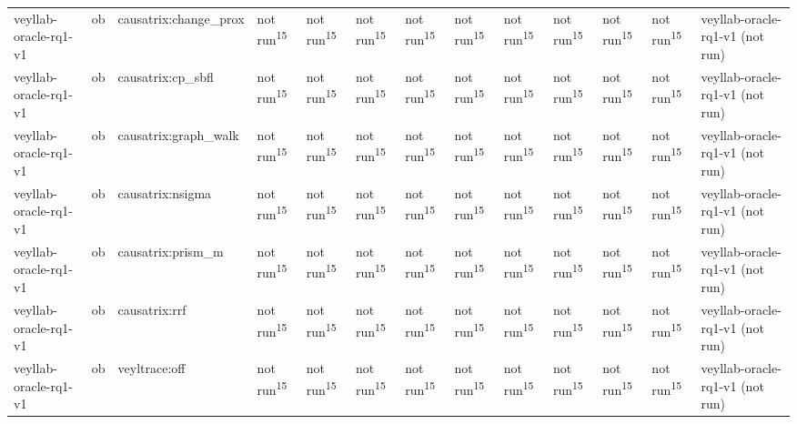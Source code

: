 \begin{table}[t]
\begin{tabular}{lllllllllllll}
veyllab-oracle-rq1-v1 & ob & causatrix:change\_prox & not run\textsuperscript{15} & not run\textsuperscript{15} & not run\textsuperscript{15} & not run\textsuperscript{15} & not run\textsuperscript{15} & not run\textsuperscript{15} & not run\textsuperscript{15} & not run\textsuperscript{15} & not run\textsuperscript{15} & veyllab-oracle-rq1-v1 (not run) \\
veyllab-oracle-rq1-v1 & ob & causatrix:cp\_sbfl & not run\textsuperscript{15} & not run\textsuperscript{15} & not run\textsuperscript{15} & not run\textsuperscript{15} & not run\textsuperscript{15} & not run\textsuperscript{15} & not run\textsuperscript{15} & not run\textsuperscript{15} & not run\textsuperscript{15} & veyllab-oracle-rq1-v1 (not run) \\
veyllab-oracle-rq1-v1 & ob & causatrix:graph\_walk & not run\textsuperscript{15} & not run\textsuperscript{15} & not run\textsuperscript{15} & not run\textsuperscript{15} & not run\textsuperscript{15} & not run\textsuperscript{15} & not run\textsuperscript{15} & not run\textsuperscript{15} & not run\textsuperscript{15} & veyllab-oracle-rq1-v1 (not run) \\
veyllab-oracle-rq1-v1 & ob & causatrix:nsigma & not run\textsuperscript{15} & not run\textsuperscript{15} & not run\textsuperscript{15} & not run\textsuperscript{15} & not run\textsuperscript{15} & not run\textsuperscript{15} & not run\textsuperscript{15} & not run\textsuperscript{15} & not run\textsuperscript{15} & veyllab-oracle-rq1-v1 (not run) \\
veyllab-oracle-rq1-v1 & ob & causatrix:prism\_m & not run\textsuperscript{15} & not run\textsuperscript{15} & not run\textsuperscript{15} & not run\textsuperscript{15} & not run\textsuperscript{15} & not run\textsuperscript{15} & not run\textsuperscript{15} & not run\textsuperscript{15} & not run\textsuperscript{15} & veyllab-oracle-rq1-v1 (not run) \\
veyllab-oracle-rq1-v1 & ob & causatrix:rrf & not run\textsuperscript{15} & not run\textsuperscript{15} & not run\textsuperscript{15} & not run\textsuperscript{15} & not run\textsuperscript{15} & not run\textsuperscript{15} & not run\textsuperscript{15} & not run\textsuperscript{15} & not run\textsuperscript{15} & veyllab-oracle-rq1-v1 (not run) \\
veyllab-oracle-rq1-v1 & ob & veyltrace:off & not run\textsuperscript{15} & not run\textsuperscript{15} & not run\textsuperscript{15} & not run\textsuperscript{15} & not run\textsuperscript{15} & not run\textsuperscript{15} & not run\textsuperscript{15} & not run\textsuperscript{15} & not run\textsuperscript{15} & veyllab-oracle-rq1-v1 (not run) \\

\end{tabular}
\end{table}
